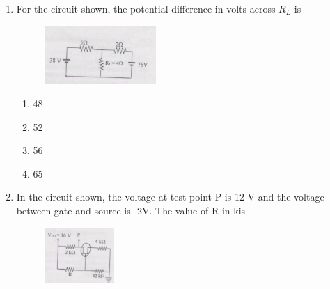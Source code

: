 \documentclass[journal,13pt,onecolumn]{IEEEtran}
\begin{document}
\begin{enumerate}[itemsep = 1em]
\begin{multicols}{4}
\begin{enumerate}
    \item 1001
    \item 0100
    \item 0110
    \item 1010
\end{enumerate} 
\end{multicols}


\item For the circuit shown, the potential difference in volts across $R_L$ is

\hfill{}

\begin{figure}[ht!]
    \centering
    \includegraphics[width=0.4\textwidth]{fig9.jpeg}
    \caption{}
    \label{fig:fig9.jpeg}
\end{figure}

\begin{multicols}{4}
\begin{enumerate}
    \item 48
    \item 52
    \item 56
    \item 65
\end{enumerate} 
\end{multicols}


\item In the circuit shown, the voltage at test point P is 12 V and the voltage between gate and source is -2V. The value of R in k\ohm is

\hfill{}

\begin{figure}[ht!]
    \centering
    \includegraphics[width=0.25\textwidth]{fig10.jpeg}
    \caption{}
    \label{fig:fig10.jpeg}
\end{figure}


\end{enumerate}
\end{document}
